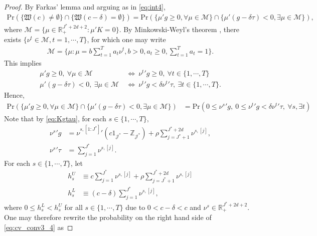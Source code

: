 \documentclass[letterpaper,11pt]{article}
\theoremstyle{myplain}
\theoremstyle{mydefinition}
\theoremstyle{myremark}
\newcommand{\HH}{\mathbb{Z}}
\numberwithin{equation}{section}
\numberwithin{figure}{section}
\begin{document}
\begin{appendices}
\begin{proof}
By Farkas' lemma \citep[][Theorem 22.1]{Rockafellar1970a}  and arguing as in \eqref{eq:int4},
\begin{align}
\mathrm{Pr}\left(\{\mathfrak{W}(c)\neq \emptyset\} \cap  \{\mathfrak{W}(c-\delta)=\emptyset\}\right)=
\mathrm{Pr}\left(\{\mu'g\ge0,\forall\mu\in\mathcal M\}\cap \{\mu'(g-\delta\tau)<0,\exists\mu\in\mathcal M\}\right),\label{eq:cv_conv3_1}
\end{align}
where $\mathcal M=\{\mu\in\mathbb R^{J^*+2d+2}_+:\mu'K=0\}.$
By Minkowski-Weyl's theorem \citep[][Theorem 3.52]{Rockafellar_Wets2005aBK}, there exists $\{\nu^t\in\mathcal M,t=1,\cdots,T\}$, for which one may write
\begin{align}
\mathcal M=\{\mu:\mu=b\sum_{t=1}^Ta_t\nu^t,b>0,a_t\ge0,\sum_{t=1}^Ta_t=1\}.\label{eq:cv_conv3_2}
\end{align}
This implies
\begin{align}
\mu'g\ge0,~\forall\mu\in\mathcal M&~\Leftrightarrow~\nu^{t}{}'g\ge0, ~\forall t\in\{1,\cdots,T\}\label{eq:cv_conv3_3a}\\
\mu'(g-\delta\tau)<0,~\exists\mu\in\mathcal M&~\Leftrightarrow~\nu^{t}{}'g<\delta\nu^{t}{}'\tau,~\exists t\in\{1,\cdots,T\}.\label{eq:cv_conv3_3b}
\end{align}
Hence,
\begin{align}
\mathrm{Pr}\left(\{\mu'g\ge0,\forall\mu\in\mathcal M\}\cap \{\mu'(g-\delta\tau)<0,\exists\mu\in\mathcal M\}\right)&=\textrm{Pr}\left(0\le \nu^{s}{}'g,~0\le \nu^{t}{}'g<\delta\nu^{t}{}'\tau,~\forall s,\exists t\right)\label{eq:cv_conv3_4}
\end{align}
Note that by \eqref{eq:Kgtau}, for each $s\in\{1,\cdots,T\},$
\begin{align}
\nu^{s}{}'g&=\nu^{s,[1:J^*]}{}'(c1_{\mathcal J^*}-\HH_{\mathcal J^*})+\rho\sum_{j=J^*+1}^{J^*+2d}\nu^{s,[j]},\label{eq:cv_conv3_5a}	\\
\nu^{s}{}'\tau&=\sum_{j=1}^{J^*}\nu^{s,[j]}.\label{eq:cv_conv3_5b}
\end{align}
For each $s\in\{1,\cdots,T\}$, let
\begin{align}
h^U_s &\equiv c\sum_{j=1}^{J^*}\nu^{s,[j]}+\rho\sum_{j=J^*+1}^{J^*+2d}\nu^{s,[j]}\label{eq:cv_conv3_6a}\\
h^L_s &\equiv (c-\delta)\sum_{j=1}^{J^*}\nu^{s,[j]},\label{eq:cv_conv3_6b}
\end{align}
where $0\le h_s^L<h_s^U$ for all $s\in\{1,\cdots,T\}$ due to $0<c-\delta<c$ and $\nu^s\in\mathbb R^{J^*+2d+2}_+$.
One may therefore rewrite the probability on the right hand side of \eqref{eq:cv_conv3_4} as

\end{proof}
\end{appendices}
\end{document}
